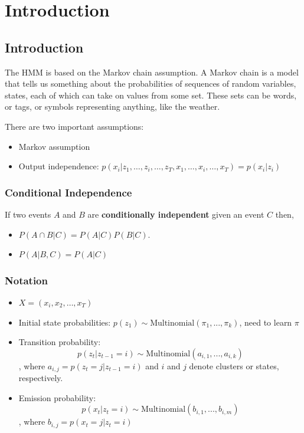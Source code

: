 \chapter{Introduction}
\section{Introduction}
The HMM is based on the Markov chain assumption. A Markov chain is a model
that tells us something about the probabilities of sequences of random variables,
states, each of which can take on values from some set. These sets can be words, or
tags, or symbols representing anything, like the weather.

There are two important assumptions:
\begin{itemize}
	\item Markov assumption
	\item Output independence: $p(x_i|z_1,\dots,z_i,\dots,z_T,x_1,\dots,x_i,\dots,x_T) = p(x_i|z_i)$
\end{itemize}

\subsection{Conditional Independence}
If two events $A$ and $B$ are \textbf{conditionally independent} given an event $C$ then,
\begin{itemize}
	\item $P(A\cap B|C) = P(A|C)P(B|C)$. 
	\item $P(A|B,C) = P(A|C)$
\end{itemize}

\subsection{Notation}

\begin{itemize}
	\item $X = (x_i, x_2,\dots, x_T)$
	\item Initial state probabilities: $p(z_1) \sim \textrm{Multinomial}(\pi_1,...,\pi_k)$, need to learn $\pi$
	\item Transition probability:
	$$p(z_t|z_{t-1}=i)\sim \textrm{Multinomial}(a_{i,1},...,a_{i,k})$$
	, where $a_{i,j} = p(z_t=j|z_{t-1}=i)$ and $i$ and $j$ denote clusters or states, respectively.
	\item Emission probability:
	$$p(x_t|z_{t}=i)\sim \textrm{Multinomial}(b_{i,1},...,b_{i,m})$$
	, where $b_{i,j} = p(x_t=j|z_{t}=i)$
\end{itemize}


